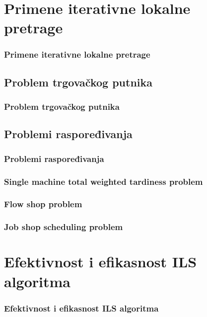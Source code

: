 \documentclass{beamer}
\begin{document}


\section{Primene iterativne lokalne pretrage}
\begin{frame}[fragile]\frametitle{Primene iterativne lokalne pretrage}

\end{frame}

\subsection{Problem trgovačkog putnika}
\begin{frame}[fragile]\frametitle{Problem trgovačkog putnika}

\end{frame}

\subsection{Problemi raspoređivanja}
\begin{frame}[fragile]\frametitle{Problemi raspoređivanja}
	\subsubsection{Single machine total weighted tardiness problem}
	\subsubsection{Flow shop problem}
	\subsubsection{Job shop scheduling problem}
\end{frame}

\section{Efektivnost i efikasnost ILS algoritma}
\begin{frame}[fragile]\frametitle{Efektivnost i efikasnost ILS algoritma}

\end{frame}
\end{document}
